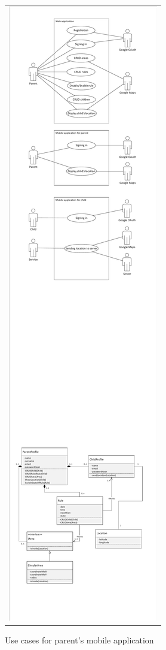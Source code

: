 \documentclass{sprawozdanie-agh}
\begin{document}
		\begin{figure}[H]
			\centering
			\begin{tabular}{c}
				\includegraphics[width=.80\textwidth]{parentUseCase} 
			\end{tabular} 
		\caption{Use cases for parent's mobile application}
		\end{figure} 
\end{document}
